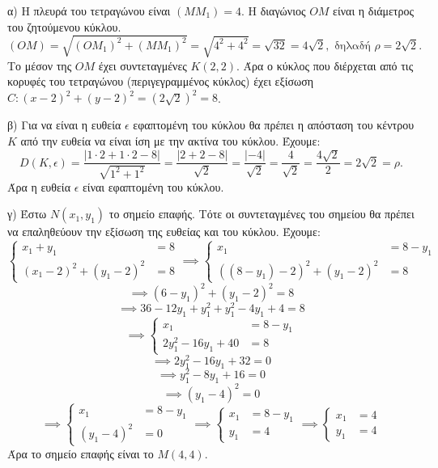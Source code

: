 α) Η πλευρά του τετραγώνου είναι $(MM_1) = 4$. Η διαγώνιος $OM$ είναι η διάμετρος του ζητούμενου κύκλου.
\[ (OM) = \sqrt{(OM_1)^2 + (MM_1)^2} = \sqrt{4^2 + 4^2} = \sqrt{32} = 4\sqrt{2}, \text{ δηλαδή } \rho = 2\sqrt{2}. \]
Το μέσον της $OM$ έχει συντεταγμένες $K(2,2)$.
Άρα ο κύκλος που διέρχεται από τις κορυφές του τετραγώνου (περιγεγραμμένος κύκλος) έχει εξίσωση $C: (x - 2)^2 + (y - 2)^2 = (2\sqrt{2})^2 = 8$.

β) Για να είναι η ευθεία $\epsilon$ εφαπτομένη του κύκλου θα πρέπει η απόσταση του κέντρου $K$ από την ευθεία να είναι ίση με την ακτίνα του κύκλου.
Έχουμε:
\[ D(K, \epsilon) = \frac{|1 \cdot 2 + 1 \cdot 2 - 8|}{\sqrt{1^2 + 1^2}} = \frac{|2 + 2 - 8|}{\sqrt{2}} = \frac{|-4|}{\sqrt{2}} = \frac{4}{\sqrt{2}} = \frac{4\sqrt{2}}{2} = 2\sqrt{2} = \rho. \]
Άρα η ευθεία $\epsilon$ είναι εφαπτομένη του κύκλου.

γ) Έστω $N(x_1, y_1)$ το σημείο επαφής. Τότε οι συντεταγμένες του σημείου θα πρέπει να επαληθεύουν την εξίσωση της ευθείας και του κύκλου.
Έχουμε:
\[
\left\{
\begin{aligned}
x_1 + y_1 &= 8 \\
(x_1 - 2)^2 + (y_1 - 2)^2 &= 8
\end{aligned}
\right.
\implies
\left\{
\begin{aligned}
x_1 &= 8 - y_1 \\
((8 - y_1) - 2)^2 + (y_1 - 2)^2 &= 8
\end{aligned}
\right.
\]
\[
\implies (6 - y_1)^2 + (y_1 - 2)^2 = 8
\]
\[
\implies 36 - 12y_1 + y_1^2 + y_1^2 - 4y_1 + 4 = 8
\]
\[
\implies
\left\{
\begin{aligned}
x_1 &= 8 - y_1 \\
2y_1^2 - 16y_1 + 40 &= 8
\end{aligned}
\right.
\]
\[
\implies 2y_1^2 - 16y_1 + 32 = 0
\]
\[
\implies y_1^2 - 8y_1 + 16 = 0
\]
\[
\implies (y_1 - 4)^2 = 0
\]
\[
\implies
\left\{
\begin{aligned}
x_1 &= 8 - y_1 \\
(y_1 - 4)^2 &= 0
\end{aligned}
\right.
\implies
\left\{
\begin{aligned}
x_1 &= 8 - y_1 \\
y_1 &= 4
\end{aligned}
\right.
\implies
\left\{
\begin{aligned}
x_1 &= 4 \\
y_1 &= 4
\end{aligned}
\right.
\]
Άρα το σημείο επαφής είναι το $M(4,4)$.

